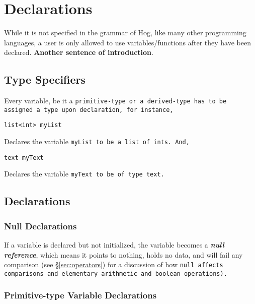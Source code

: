 \documentclass{book}
\begin{document}
\chapter{Declarations} %
\label{cha:declarations}

While it is not specified in the grammar of Hog, like many other programming
languages, a user is only allowed to use variables/functions after they have been
declared. \textbf{Another sentence of introduction}.

\section{Type Specifiers} %
\label{sec:type_specifiers}

Every variable, be it a \tt primitive-type \rm or a \tt derived-type \rm has to be
assigned a type upon declaration, for instance,

\begin{verbatim}
list<int> myList
\end{verbatim}

Declares the variable \tt myList \rm to be a \tt list \rm of \tt int\rm s. And,

\begin{verbatim}
text myText
\end{verbatim}

Declares the variable \tt myText \rm to be of type \tt text\rm .


\section{Declarations} %
\label{sec:declarations}

\subsection{Null Declarations} %
\label{sub:null_declarations}

If a variable is declared but not initialized, the variable becomes a
\textbf{\emph{null reference}}, which means it points to nothing, holds no data,
and will fail any comparison (see \S \ref{sec:operators}) for a discussion of how
\tt null \rm affects comparisons and elementary arithmetic and boolean operations).


\subsection{Primitive-type Variable Declarations} %
\label{sub:primitive_type_variable_declarations}
\end{document}
